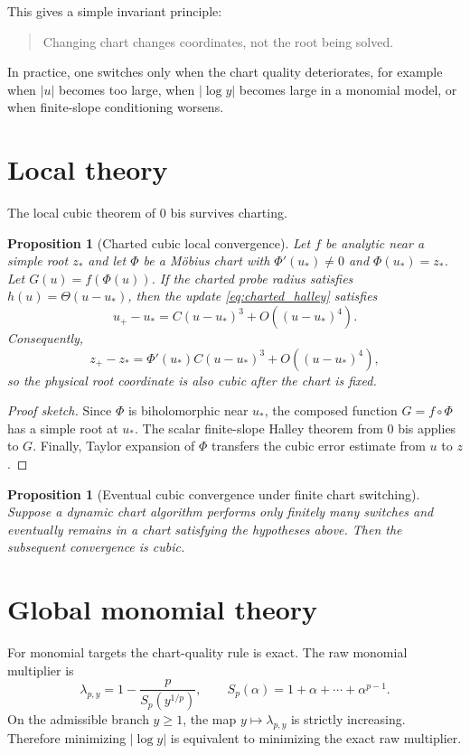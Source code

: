 \documentclass[11pt]{article}
\newtheorem{proposition}[theorem]{Proposition}
\theoremstyle{definition}
\begin{document}
This gives a simple invariant principle:
\begin{quote}
Changing chart changes coordinates, not the root being solved.
\end{quote}
In practice, one switches only when the chart quality deteriorates, for example when $|u|$ becomes too large, when $|\log y|$ becomes large in a monomial model, or when finite-slope conditioning worsens.

\section{Local theory}
The local cubic theorem of 0 bis survives charting.

\begin{proposition}[Charted cubic local convergence]
Let $f$ be analytic near a simple root $z_*$ and let $\Phi$ be a Möbius chart with $\Phi'(u_*)\neq0$ and $\Phi(u_*)=z_*$. Let $G(u)=f(\Phi(u))$. If the charted probe radius satisfies $h(u)=\Theta(u-u_*)$, then the update \cref{eq:charted_halley} satisfies
\[
u_+-u_* = C(u-u_*)^3+O((u-u_*)^4).
\]
Consequently,
\[
z_+-z_* = \Phi'(u_*)C(u-u_*)^3+O((u-u_*)^4),
\]
so the physical root coordinate is also cubic after the chart is fixed.
\end{proposition}

\begin{proof}[Proof sketch]
Since $\Phi$ is biholomorphic near $u_*$, the composed function $G=f\circ\Phi$ has a simple root at $u_*$. The scalar finite-slope Halley theorem from 0 bis applies to $G$. Finally, Taylor expansion of $\Phi$ transfers the cubic error estimate from $u$ to $z$.
\end{proof}

\begin{proposition}[Eventual cubic convergence under finite chart switching]
Suppose a dynamic chart algorithm performs only finitely many switches and eventually remains in a chart satisfying the hypotheses above. Then the subsequent convergence is cubic.
\end{proposition}

\section{Global monomial theory}
For monomial targets the chart-quality rule is exact. The raw monomial multiplier is
\[
\lambda_{p,y}=1-\frac{p}{S_p(y^{1/p})},
\qquad
S_p(\alpha)=1+\alpha+\cdots+\alpha^{p-1}.
\]
On the admissible branch $y\ge1$, the map $y\mapsto\lambda_{p,y}$ is strictly increasing. Therefore minimizing $|\log y|$ is equivalent to minimizing the exact raw multiplier.
\end{document}
